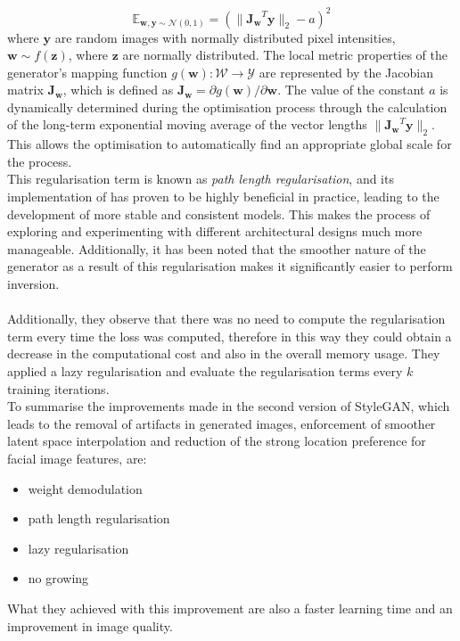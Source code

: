 \begin{equation}
    \mathbb{E}_{\mathbf{w,y}\sim \mathcal{N}(0,1)}=(\| \mathbf{J_w}^T\mathbf{y}\|_2 - a)^2
\end{equation}
where $\mathbf{y}$ are random images with normally distributed pixel intensities, $\mathbf{w} \sim f(\mathbf{z})$, where $\mathbf{z}$ are normally distributed. The local metric properties of the generator's mapping function $g(\mathbf{w}): \mathcal{W}\rightarrow \mathcal{Y}$ are represented by the Jacobian matrix $\mathbf{J_w}$, which is defined as $\mathbf{J_w}=\partial g(\mathbf{w})/\partial \mathbf{w}$.
The value of the constant $a$ is dynamically determined during the optimisation process through the calculation of the long-term exponential moving average of the vector lengths $\| \mathbf{J_w}^T\mathbf{y} \|_2$. This allows the optimisation to automatically find an appropriate global scale for the process.\\
This regularisation term is known as \textit{path length regularisation}, and its implementation of has proven to be highly beneficial in practice, leading to the development of more stable and consistent models. This makes the process of exploring and experimenting with different architectural designs much more manageable. Additionally, it has been noted that the smoother nature of the generator as a result of this regularisation makes it significantly easier to perform inversion.\\ \\
Additionally, they observe that there was no need to compute the regularisation term every time the loss was computed, therefore in this way they could obtain a decrease in the computational cost and also in the overall memory usage. They applied a lazy regularisation and evaluate the regularisation terms every $k$ training iterations.\\
To summarise the improvements made in the second version of StyleGAN, which leads to the removal of artifacts in generated images, enforcement of smoother latent space interpolation and reduction of the strong location preference for facial image features, are:
\begin{itemize}
    \item weight demodulation
    \item path length regularisation
    \item lazy regularisation
    \item no growing
\end{itemize}
What they achieved with this improvement are also a faster learning time and an improvement in image quality.

